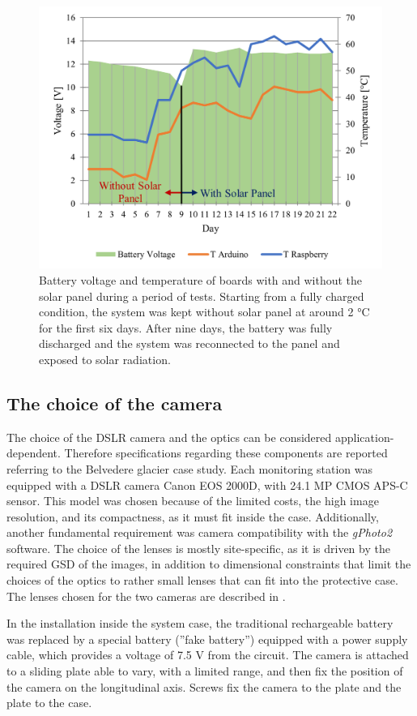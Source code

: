 \begin{figure}[ht!]
  \centering
  \includegraphics[width=.6\textwidth]{nominal.png}
  \caption{Battery voltage and temperature of boards with and without the solar panel
    during a period of tests. Starting from a fully charged condition, the system was
    kept without solar panel at around 2 °C for the first six days. After nine days, the
    battery was fully discharged and the system was reconnected to the panel and exposed
    to solar radiation.}
  \label{fig:4:nominal_performance}
\end{figure}

\subsection{The choice of the camera}\label{camera}
The choice of the DSLR camera and the optics can be considered application-dependent.
Therefore specifications regarding these components are reported referring to the
Belvedere glacier case study. 
Each monitoring station was equipped with a DSLR camera Canon EOS 2000D, with 24.1 MP CMOS \mbox{APS-C} sensor. 
This model was chosen because of the limited costs, the high image resolution, and its compactness, as it must fit inside the case. 
Additionally, another fundamental requirement was camera compatibility with the \textit{gPhoto2} software. 
The choice of the lenses is mostly site-specific, as it is driven by the required GSD of the images, in addition
to dimensional constraints that limit the choices of the optics to rather small lenses that can fit into the protective case.
The lenses chosen for the two cameras are described in .

In the installation inside the system case, the traditional rechargeable battery was replaced by a special battery 
(”fake battery”) equipped with a power supply cable, which provides a voltage of 7.5 V from the circuit. 
The camera is attached to a sliding plate able to vary, with a limited range, and then fix the position of the camera 
on the longitudinal axis. Screws fix the camera to the plate and the plate to the case.

